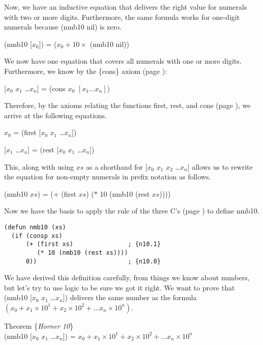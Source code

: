 Now, we have an inductive equation that delivers the right value for
numerals with two or more digits. Furthermore, the same formula works
for one-digit numerals because (nmb10 nil) is zero.
\begin{center}
(nmb10 [$x_0$]) = ($x_0 + 10 \times$ (nmb10 nil))
\end{center}

We now have one equation that covers all numerals with one or more digits.
Furthermore, we know by the \{cons\} axiom
(page \pageref{cons-axiom-informal}):
\begin{center}
[$x_0$ $x_1$ \dots $x_{n}$] = (cons $x_0$ $[x_1 \dots x_n]$)
\end{center}

Therefore, by the axioms relating the functions
first, rest, and cons
(page \pageref{first-rest-cons}),
we arrive at the following equations.

\begin{samepage}
\begin{center}
$x_0$ = (first [$x_0$ $x_1$ \dots $x_{n}$]) %
\end{center}                                %
\begin{center}
[$x_1$ \dots $x_{n}$] = (rest [$x_0$ $x_1$ \dots $x_{n}$])
\end{center}
\end{samepage}


This, along with using $xs$
as a shorthand for [$x_0$ $x_1$ $x_2$ \dots $x_{n}$]
allows us to rewrite the equation
for non-empty numerals in prefix notation as follows.
\begin{center}
(nmb10 $xs$) = (+ (first $xs$) ($*$ 10 (nmb10 (rest $xs$))))
\end{center}

Now we have the basis to apply the rule of the three C's
(page \pageref{fig:inductive-def-keys}) to define nmb10.


\label{nmb10-defun}
\begin{Verbatim}
(defun nmb10 (xs)
  (if (consp xs)
      (+ (first xs)               ; {n10.1}
         (* 10 (nmb10 (rest xs))))
      0))                         ; {n10.0}
\end{Verbatim}

We have derived this definition carefully,
from things we know about numbers,
but let's try to use logic to be sure we got it right.
We want to prove that
(nmb10 [$x_0$ $x_1$ \dots $x_{n}$])
delivers the same number as the formula
$(x_0 + x_1 \times 10^1 + x_2 \times 10^2 + \dots x_{n} \times 10^{n})$.
\begin{samepage}
\label{horner10-thm}
\begin{center}
Theorem \{\emph{Horner 10}\} \\
(nmb10 [$x_0$ $x_1$ \dots $x_{n}$]) =
$x_0 + x_1 \times 10^1 + x_2 \times 10^2 + \dots x_{n} \times 10^{n}$
\end{center}
\end{samepage}

